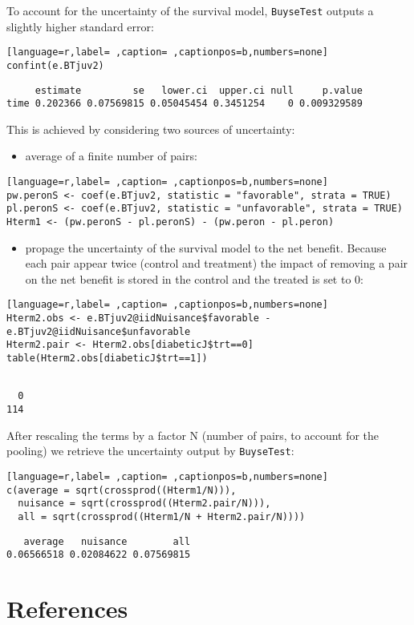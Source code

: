 \documentclass[12pt]{article}
\begin{document}
To account for the uncertainty of the survival model, \texttt{BuyseTest}
outputs a slightly higher standard error:
\begin{lstlisting}[language=r,label= ,caption= ,captionpos=b,numbers=none]
confint(e.BTjuv2)
\end{lstlisting}

\begin{verbatim}
     estimate         se   lower.ci  upper.ci null     p.value
time 0.202366 0.07569815 0.05045454 0.3451254    0 0.009329589
\end{verbatim}


This is achieved by considering two sources of uncertainty:
\begin{itemize}
\item average of a finite number of pairs:
\end{itemize}
\begin{lstlisting}[language=r,label= ,caption= ,captionpos=b,numbers=none]
pw.peronS <- coef(e.BTjuv2, statistic = "favorable", strata = TRUE)
pl.peronS <- coef(e.BTjuv2, statistic = "unfavorable", strata = TRUE)
Hterm1 <- (pw.peronS - pl.peronS) - (pw.peron - pl.peron)
\end{lstlisting}

\begin{itemize}
\item propage the uncertainty of the survival model to the net
benefit. Because each pair appear twice (control and treatment) the
impact of removing a pair on the net benefit is stored in the
control and the treated is set to 0:
\end{itemize}
\begin{lstlisting}[language=r,label= ,caption= ,captionpos=b,numbers=none]
Hterm2.obs <- e.BTjuv2@iidNuisance$favorable - e.BTjuv2@iidNuisance$unfavorable
Hterm2.pair <- Hterm2.obs[diabeticJ$trt==0]
table(Hterm2.obs[diabeticJ$trt==1])
\end{lstlisting}

\begin{verbatim}

  0 
114
\end{verbatim}


After rescaling the terms by a factor N (number of pairs, to account
for the pooling) we retrieve the uncertainty output by \texttt{BuyseTest}:
\begin{lstlisting}[language=r,label= ,caption= ,captionpos=b,numbers=none]
c(average = sqrt(crossprod((Hterm1/N))),
  nuisance = sqrt(crossprod((Hterm2.pair/N))),
  all = sqrt(crossprod((Hterm1/N + Hterm2.pair/N))))
\end{lstlisting}

\begin{verbatim}
   average   nuisance        all 
0.06566518 0.02084622 0.07569815
\end{verbatim}



\section*{References}
\label{sec:org0211660}
\begingroup
\renewcommand{\section}[2]{}




\endgroup
\end{document}
